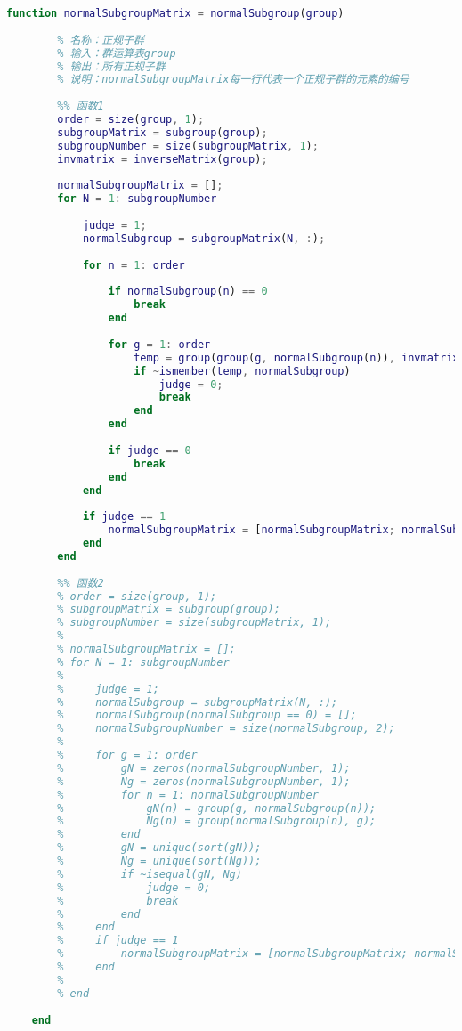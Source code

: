 \begin{lstlisting}[language=Matlab, caption={正规子群}, label={normalSubgroup}]
	function normalSubgroupMatrix = normalSubgroup(group)
	
	    % 名称：正规子群
	    % 输入：群运算表group
	    % 输出：所有正规子群
	    % 说明：normalSubgroupMatrix每一行代表一个正规子群的元素的编号
	
	    %% 函数1
	    order = size(group, 1);
	    subgroupMatrix = subgroup(group);
	    subgroupNumber = size(subgroupMatrix, 1);
	    invmatrix = inverseMatrix(group);
	    
	    normalSubgroupMatrix = [];
	    for N = 1: subgroupNumber
	
	        judge = 1;
	        normalSubgroup = subgroupMatrix(N, :);
	
	        for n = 1: order
	
	            if normalSubgroup(n) == 0
	                break
	            end
	
	            for g = 1: order
	                temp = group(group(g, normalSubgroup(n)), invmatrix(g));
	                if ~ismember(temp, normalSubgroup)
	                    judge = 0;
	                    break
	                end
	            end
	
	            if judge == 0
	                break
	            end
	        end
	        
	        if judge == 1
	            normalSubgroupMatrix = [normalSubgroupMatrix; normalSubgroup];
	        end
	    end
	
	    %% 函数2
	    % order = size(group, 1);
	    % subgroupMatrix = subgroup(group);
	    % subgroupNumber = size(subgroupMatrix, 1);
	    % 
	    % normalSubgroupMatrix = [];
	    % for N = 1: subgroupNumber
	    % 
	    %     judge = 1;
	    %     normalSubgroup = subgroupMatrix(N, :);
	    %     normalSubgroup(normalSubgroup == 0) = [];
	    %     normalSubgroupNumber = size(normalSubgroup, 2);
	    % 
	    %     for g = 1: order
	    %         gN = zeros(normalSubgroupNumber, 1);
	    %         Ng = zeros(normalSubgroupNumber, 1);
	    %         for n = 1: normalSubgroupNumber
	    %             gN(n) = group(g, normalSubgroup(n));
	    %             Ng(n) = group(normalSubgroup(n), g);
	    %         end
	    %         gN = unique(sort(gN));
	    %         Ng = unique(sort(Ng));
	    %         if ~isequal(gN, Ng)
	    %             judge = 0;
	    %             break
	    %         end
	    %     end
	    %     if judge == 1
	    %         normalSubgroupMatrix = [normalSubgroupMatrix; normalSubgroup, zeros(1, order-size(normalSubgroup, 2))];
	    %     end
	    % 
	    % end
	
	end
	
\end{lstlisting}

